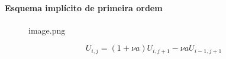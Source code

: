 \documentclass[11pt]{article}
\begin{document}
        

        
        
        

        
    \hypertarget{esquema-impluxedcito-de-primeira-ordem}{%
\paragraph{Esquema implícito de primeira
ordem}}

    \begin{figure}
\centering
\caption{image.png}
\end{figure}

    \[U_{i,j} = (1+\nu a)U_{i,j+1} - \nu aU_{i-1,j+1}\]
\end{document}
